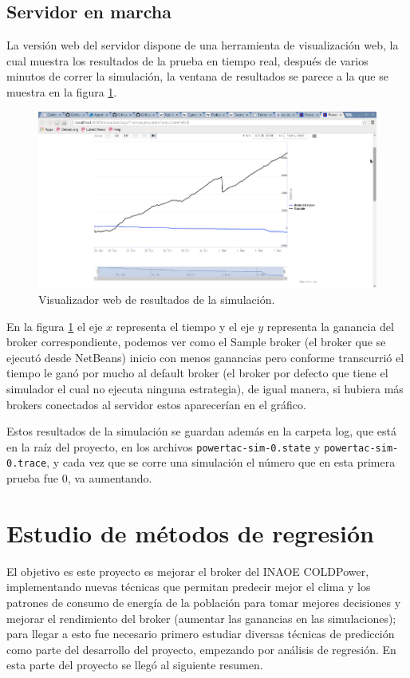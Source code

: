\subsection{Servidor en marcha}
La versión web del servidor dispone de una herramienta de visualización web, la cual muestra los resultados de la prueba en tiempo real, después de varios minutos de correr la simulación, la ventana de resultados se parece a la que se muestra en la figura \ref{fig:visualizadorWebResultados}.

\begin{figure}[h]
	\centering
	\includegraphics[width=13cm]{img/visualizadorWebResultados.png}
	\caption{Visualizador web de resultados de la simulación.}
	\label{fig:visualizadorWebResultados}
\end{figure}

En la figura \ref{fig:visualizadorWebResultados} el eje $x$ representa el tiempo y el eje $y$ representa la ganancia del broker correspondiente, podemos ver como el Sample broker (el broker que se ejecutó desde NetBeans) inicio con menos ganancias pero conforme
transcurrió el tiempo le ganó por mucho al default broker (el broker por defecto que tiene el simulador el cual no ejecuta ninguna estrategia), de igual manera, si hubiera más brokers conectados al servidor estos aparecerían en el gráfico.

Estos resultados de la simulación se guardan además en la carpeta log, que está en la raíz del proyecto, en los archivos \texttt{powertac-sim-0.state} y \texttt{powertac-sim-0.trace}, y cada vez que se corre una simulación el número que en esta primera prueba fue 0, va aumentando.

\section{Estudio de métodos de regresión}
El objetivo es este proyecto es mejorar el broker del INAOE COLDPower, implementando nuevas técnicas que permitan predecir mejor el clima y los patrones de consumo de energía de la población para tomar mejores decisiones y mejorar el rendimiento del broker (aumentar las ganancias en las simulaciones); para llegar a esto fue necesario primero estudiar diversas técnicas de predicción como parte del desarrollo del proyecto, empezando por análisis de regresión. En esta parte del proyecto se llegó al siguiente resumen.

